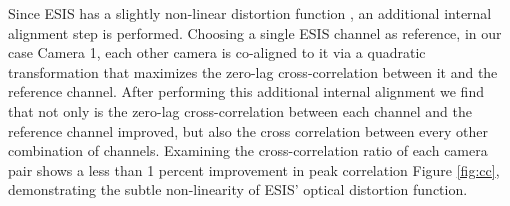     	Since ESIS has a slightly non-linear distortion function \citep{ESIS}, an additional internal alignment step is performed.
    	Choosing a single ESIS channel as reference, in our case Camera 1, each other camera is co-aligned to it via a quadratic transformation that maximizes the zero-lag cross-correlation between it and the reference channel.
    	After performing this additional internal alignment we find that not only is the zero-lag cross-correlation between each channel and the reference channel improved, but also the cross correlation between every other combination of channels.
    	Examining the cross-correlation ratio of each camera pair shows a less than 1 percent improvement in peak correlation Figure \ref{fig:cc}, demonstrating the subtle non-linearity of ESIS' optical distortion function.
    

	       
        	
%        
        
        
%        
%        

  

